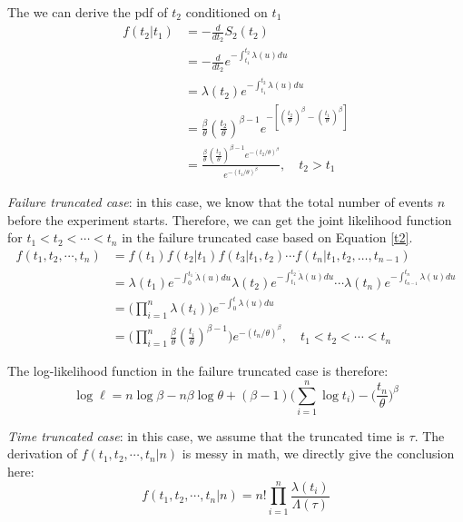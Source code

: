 \documentclass[12pt]{book}
\numberwithin{equation}{chapter}
\begin{document}
The we can derive the pdf of \(t_2\) conditioned on \(t_1\)
\begin{equation}\label{t2}
\begin{aligned}
f(t_2|t_1) & = - \frac{d}{dt_2}S_2(t_2)\\
& = - \frac{d}{dt_2}e^{-\int_{t_1}^{t_2}\lambda(u)du}\\
& = \lambda(t_2)e^{-\int_{t_1}^{t_2}\lambda(u)du}\\
& = \frac{\beta}{\theta}(\frac{t_2}{\theta})^{\beta - 1}e^{-[(\frac{t_2}{\theta})^\beta - (\frac{t_1}{\theta})^\beta]}\\
& = \frac{\frac{\beta}{\theta}(\frac{t_2}{\theta})^{\beta - 1}e^{-(t_2/\theta)^\beta }}{e^{- (t_1/\theta)^\beta}}, \quad t_2 > t_1
\end{aligned}
\end{equation}

\emph{Failure truncated case}: in this case, we know that the total number of events \(n\) before the experiment starts. Therefore, we can get the joint likelihood function for \(t_1 < t_2 < \cdots < t_n\) in the failure truncated case based on Equation \ref{t2}.
\begin{equation}\label{pdfn}
\begin{aligned}
f(t_1, t_2, \cdots, t_n) & = f(t_1)f(t_2|t_1)f(t_3|t_1, t_2) \cdots f(t_n|t_1, t_2, \dots, t_{n - 1}) \\
& = \lambda (t_1)e^{-\int_{0}^{t_1} \dot \lambda (u)du}\lambda (t_2)e^{-\int_{t_1}^{t_2} \dot \lambda (u)du}\cdots\lambda (t_n)e^{-\int_{t_{n-1}}^{t_n}\lambda (u)du}\\
& = \Big(\prod_{i=1}^n\lambda(t_i)\Big)e^{-\int_0^t\lambda(u)du}\\
& = \Big(\prod_{i=1}^n\frac{\beta}{\theta}(\frac{t_i}{\theta})^{\beta - 1}\Big)e^{-(t_n/\theta)^\beta}, \quad t_1 < t_2 < \cdots < t_n
\end{aligned}
\end{equation}

The log-likelihood function in the failure truncated case is therefore:
\[\log \ell = n\log\beta - n\beta\log\theta + (\beta - 1)\bigg(\sum_{i=1}^n\log t_i\bigg) - \Big(\frac{t_n}{\theta}\Big)^\beta\]

\emph{Time truncated case}: in this case, we assume that the truncated time is \(\tau\). The derivation of \(f(t_1, t_2, \cdots, t_n|n)\) is messy in math, we directly give the conclusion here: \[f(t_1, t_2, \cdots, t_n|n) = n!\prod_{i=1}^n\frac{\lambda(t_i)}{\Lambda(\tau)}\]
\end{document}
